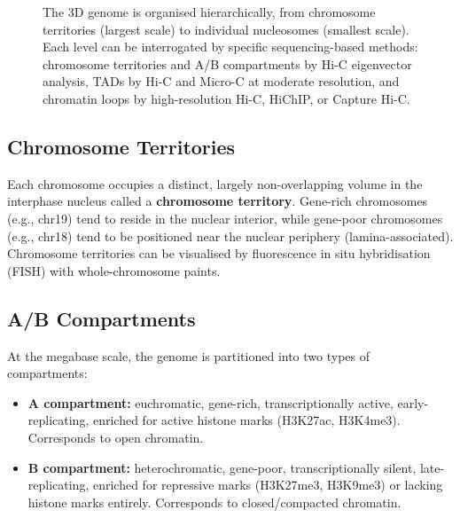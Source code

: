 \begin{figure}[htbp]
\caption[Hierarchical levels of 3D genome organisation.]{The 3D genome is organised hierarchically, from chromosome territories (largest scale) to individual nucleosomes (smallest scale). Each level can be interrogated by specific sequencing-based methods: chromosome territories and A/B compartments by Hi-C eigenvector analysis, TADs by Hi-C and Micro-C at moderate resolution, and chromatin loops by high-resolution Hi-C, HiChIP, or Capture Hi-C.}
\label{fig:3dgenome:hierarchy}
\end{figure}

\subsection{Chromosome Territories}
\label{subsec:3dgenome:territories}

Each chromosome occupies a distinct, largely non-overlapping volume in the interphase nucleus called a \textbf{chromosome territory}. Gene-rich chromosomes (e.g., chr19) tend to reside in the nuclear interior, while gene-poor chromosomes (e.g., chr18) tend to be positioned near the nuclear periphery (lamina-associated). Chromosome territories can be visualised by fluorescence in situ hybridisation (FISH) with whole-chromosome paints.

\subsection{A/B Compartments}
\label{subsec:3dgenome:compartments}

At the megabase scale, the genome is partitioned into two types of compartments:

\begin{itemize}[itemsep=3pt]
  \item \textbf{A compartment:} euchromatic, gene-rich, transcriptionally active, early-replicating, enriched for active histone marks (H3K27ac, H3K4me3). Corresponds to open chromatin.
  \item \textbf{B compartment:} heterochromatic, gene-poor, transcriptionally silent, late-replicating, enriched for repressive marks (H3K27me3, H3K9me3) or lacking histone marks entirely. Corresponds to closed/compacted chromatin.
\end{itemize}

